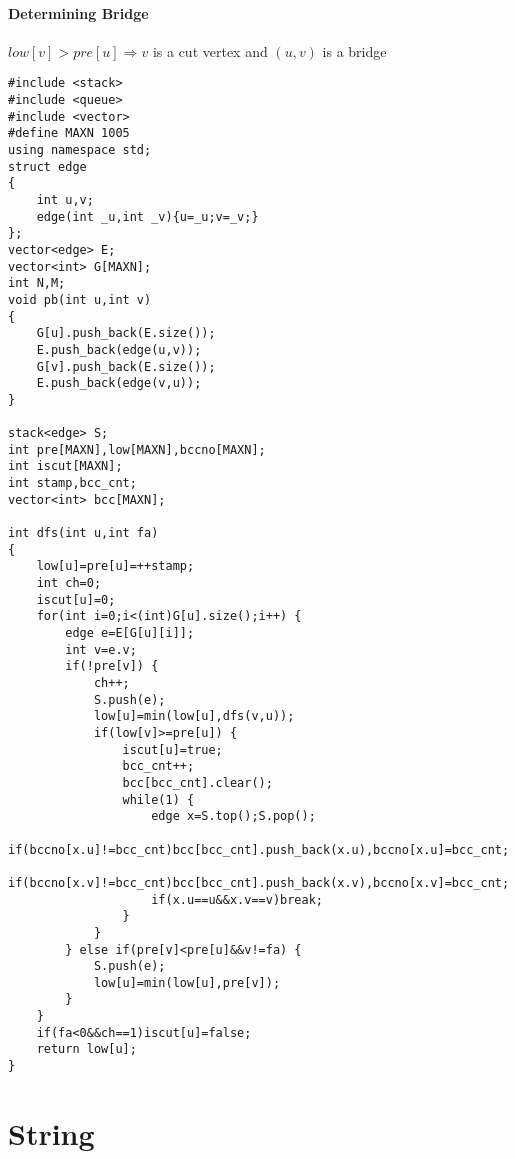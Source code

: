 \paragraph{Determining Bridge}
$low[v] > pre[u] \Rightarrow v$ is a cut vertex and $(u,v)$ is a bridge
\begin{lstlisting}
#include <stack>
#include <queue>
#include <vector>
#define MAXN 1005
using namespace std;
struct edge
{
	int u,v;
	edge(int _u,int _v){u=_u;v=_v;}
};
vector<edge> E;
vector<int> G[MAXN];
int N,M;
void pb(int u,int v)
{
	G[u].push_back(E.size());
	E.push_back(edge(u,v));
	G[v].push_back(E.size());
	E.push_back(edge(v,u));
}

stack<edge> S;
int pre[MAXN],low[MAXN],bccno[MAXN];
int iscut[MAXN];
int stamp,bcc_cnt;
vector<int> bcc[MAXN];

int dfs(int u,int fa)
{
	low[u]=pre[u]=++stamp;
	int ch=0;
	iscut[u]=0;
	for(int i=0;i<(int)G[u].size();i++) {
		edge e=E[G[u][i]];
		int v=e.v;
		if(!pre[v]) {
			ch++;
			S.push(e);
			low[u]=min(low[u],dfs(v,u));
			if(low[v]>=pre[u]) {
				iscut[u]=true;
				bcc_cnt++;
				bcc[bcc_cnt].clear();
				while(1) {
					edge x=S.top();S.pop();
					if(bccno[x.u]!=bcc_cnt)bcc[bcc_cnt].push_back(x.u),bccno[x.u]=bcc_cnt;
					if(bccno[x.v]!=bcc_cnt)bcc[bcc_cnt].push_back(x.v),bccno[x.v]=bcc_cnt;
					if(x.u==u&&x.v==v)break;
				}
			}
		} else if(pre[v]<pre[u]&&v!=fa) {
			S.push(e);
			low[u]=min(low[u],pre[v]);
		}
	}
	if(fa<0&&ch==1)iscut[u]=false;
	return low[u];
}
\end{lstlisting}
\section{String}
